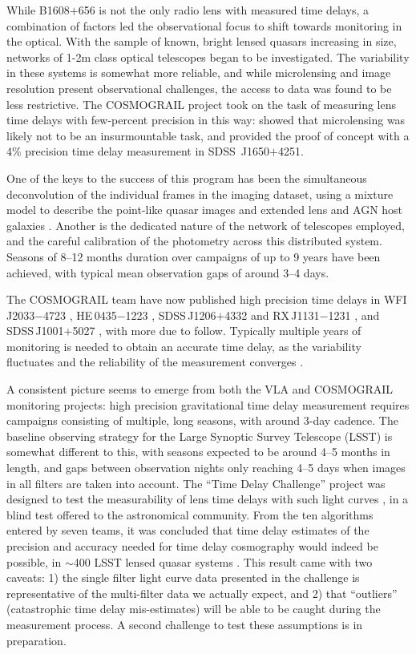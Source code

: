 While B1608$+$656 is not the only radio lens with measured time delays,
a combination of factors  led the observational focus to shift towards
monitoring in the optical. With the sample of known, bright lensed
quasars increasing in size,  networks of 1-2m class optical telescopes
began to be investigated. The variability in these systems is somewhat
more reliable, and while microlensing  and image resolution present
observational challenges, the access to data was found to be less
restrictive. The COSMOGRAIL project took on the task of measuring lens
time delays with few-percent precision in this way:  \citet{Eig++05}
showed that microlensing was likely not to be an insurmountable task,
and \citet{Vui++07} provided the proof of  concept with a 4\% precision
time delay measurement in SDSS\ J1650$+$4251.

One of the keys to the success of this program has been the simultaneous
deconvolution of the individual frames in the imaging dataset, using  a
mixture model to describe the point-like quasar images and extended lens
and AGN host galaxies \citep{MCS98}.  Another is the dedicated nature of
the network of telescopes employed, and the  careful calibration of the
photometry across this distributed system. Seasons of 8--12 months
duration over campaigns of up to 9 years have been achieved, with
typical mean observation gaps of around 3--4 days.

The COSMOGRAIL team have now published high precision time delays in
WFI\,J2033$-$4723 \citep[][3.8\%]{Vui++08}, HE\,0435$-$1223
\citep[][5.6\%]{Cou++11}, SDSS\,J1206$+$4332 \citep[][2.7\%]{Eul++13}
and  RX\,J1131$-$1231 \citep[][1.5\%]{Tew++13}, and SDSS\,J1001$+$5027
\citep[][2.8\%]{RK++13}, with more due to follow.  Typically multiple
years of monitoring is needed to obtain an accurate  time delay, as the
variability fluctuates and the reliability of the  measurement converges
\citep[see the discussion in e.g.\ ][]{Tew++13}.

A consistent picture seems to emerge from both the VLA and COSMOGRAIL
monitoring projects: high precision gravitational time delay
measurement requires campaigns consisting of multiple, long seasons,
with around 3-day cadence. The baseline observing strategy for the
Large Synoptic Survey Telescope (LSST) is somewhat different to this,
with seasons expected to be around 4--5 months in length, and gaps
between observation nights only reaching 4--5 days when images in all
filters are taken into account. The ``Time Delay Challenge'' project
was designed to test the measurability of lens time delays with such
light curves \citep{DoblerEtal2015}, in a blind test offered to the
astronomical community. From the ten algorithms entered by seven
teams, it was concluded that time delay estimates of the precision and
accuracy needed for time delay cosmography would indeed be possible,
in $\sim$400 LSST lensed quasar systems \citep{LiaoEtal2015}. This
result came with two caveats: 1) the single filter light curve data
presented in the challenge is representative of the multi-filter data
we actually expect, and 2) that ``outliers'' (catastrophic time delay
mis-estimates) will be able to be caught during the measurement
process.  A second challenge to test these assumptions is in
preparation.



